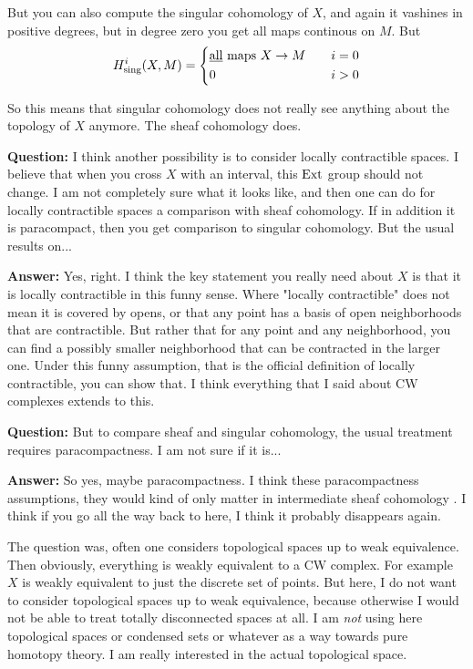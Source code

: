 But you can also compute the singular cohomology of $X$, and again it vashines in positive degrees, but in degree zero you get all maps continous on $M$. 
But 
\begin{align*}
H^i_{\mathrm{sing}}(X,M) = 
\left\{
    \begin {aligned}
         & \text{\underline{all} maps $X \to M$} \quad & i = 0 \\
         & 0 \quad & i > 0                  
    \end{aligned}
\right.
\end{align*}

So this means that singular cohomology does not really see anything about the topology of $X$ anymore. The sheaf cohomology does.

\textbf{Question:} I think another possibility is to consider locally contractible spaces. I believe that when you cross $X$ with an interval, this $\operatorname{Ext}$ group should not change. I am not completely sure what it looks like, and then one can do for locally contractible spaces a comparison with sheaf cohomology. If in addition it is paracompact, then you get comparison to singular cohomology. But the usual results on... 

\textbf{Answer:} Yes, right. I think the key statement you really need about $X$ is that it is locally contractible in this funny sense. Where "locally contractible" does not mean it is covered by opens, or that any point has a basis of open neighborhoods that are contractible. 
But rather that for any point and any neighborhood, you can find a possibly smaller neighborhood that can be contracted in the larger one. Under this funny assumption, that is the official definition of locally contractible, you can show that. I think everything that I said about CW complexes extends to this. 

\textbf{Question:} But to compare sheaf and singular cohomology, the usual treatment requires paracompactness. I am not sure if it is... 

\textbf{Answer:} So yes, maybe paracompactness.
I think these paracompactness assumptions, they would kind of only matter in intermediate sheaf cohomology . I think if you go all the way back to here, I think it probably disappears again. 



The question was, often one considers topological spaces up to weak equivalence. 
Then obviously, everything is weakly equivalent to a CW complex.
For example $X$ is weakly equivalent to just the discrete set of points. 
But here, I do not want to consider topological spaces up to weak equivalence, because otherwise I would not be able to treat totally disconnected spaces at all. 
I am \emph{not} using here topological spaces or condensed sets or whatever as a way towards pure homotopy theory. I am really interested in the actual topological space.

